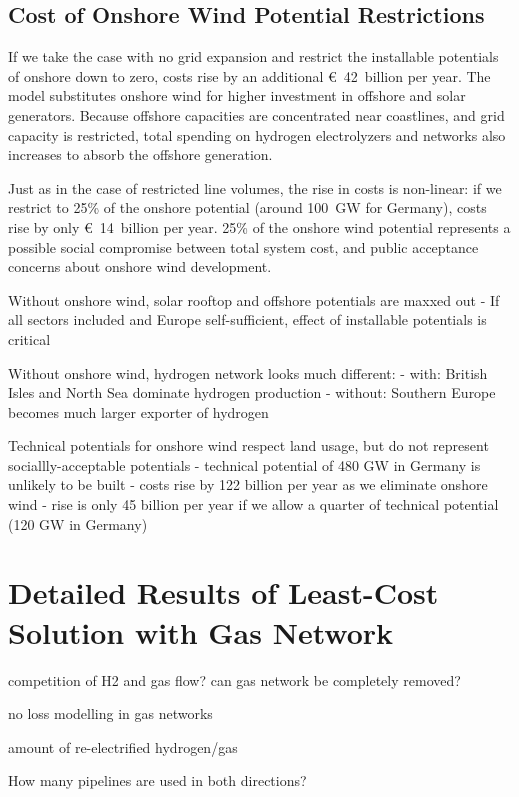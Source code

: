 \subsection{Cost of Onshore Wind Potential Restrictions}
\label{sec:si:onw}

If we take the case with no grid expansion and restrict the installable
potentials of onshore down to zero, costs rise by an additional \euro~42~billion
per year. The model substitutes onshore wind for
higher investment in offshore and solar generators. Because offshore capacities
are concentrated near coastlines, and grid capacity is restricted, total
spending on hydrogen electrolyzers and networks also increases to absorb the
offshore generation.

Just as in the case of restricted line volumes, the rise in costs is non-linear:
if we restrict to 25\% of the onshore potential (around 100~GW for Germany),
costs rise by only \euro~14~billion per year. 25\% of the onshore wind potential
represents a possible social compromise between total system cost, and public
acceptance concerns about onshore wind development.

Without onshore wind, solar rooftop and offshore potentials are maxxed out
- If all sectors included and Europe self-sufficient, effect of installable potentials is critical

Without onshore wind, hydrogen network looks much different:
- with: British Isles and North Sea dominate hydrogen production
- without: Southern Europe becomes much larger exporter of hydrogen

Technical potentials for onshore wind respect land usage, but do not represent
sociallly-acceptable potentials
- technical potential of 480 GW in Germany is unlikely to be built
- costs rise by 122 billion per year as we eliminate onshore wind
- rise is only 45 billion per year if we allow a quarter of technical potential (120 GW in Germany)

\section{Detailed Results of Least-Cost Solution with Gas Network}
\label{sec:si:detailed}

competition of H2 and gas flow? can gas network be completely removed?

no loss modelling in gas networks

amount of re-electrified hydrogen/gas

How many pipelines are used in both directions?

